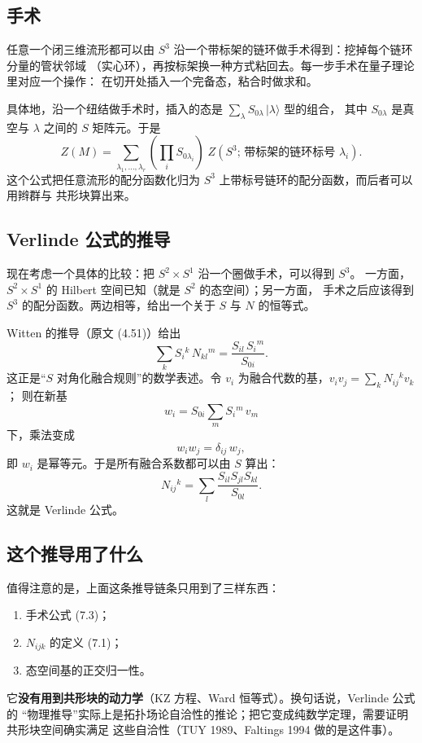 \subsection{手术}

任意一个闭三维流形都可以由 $S^3$ 沿一个带标架的链环做手术得到：挖掉每个链环分量的管状邻域
（实心环），再按标架换一种方式粘回去。每一步手术在量子理论里对应一个操作：
在切开处插入一个完备态，粘合时做求和。

具体地，沿一个纽结做手术时，插入的态是 $\sum_\lambda S_{0\lambda}\,|\lambda\rangle$ 型的组合，
其中 $S_{0\lambda}$ 是真空与 $\lambda$ 之间的 $S$ 矩阵元。于是
\begin{equation}
Z(M)=\sum_{\lambda_1,\dots,\lambda_r}
\left(\prod_{i}S_{0\lambda_i}\right)\;Z\!\left(S^3;\,\text{带标架的链环标号 }\lambda_i\right). \tag{7.3}
\end{equation}
这个公式把任意流形的配分函数化归为 $S^3$ 上带标号链环的配分函数，而后者可以用辫群与
共形块算出来。

\subsection{Verlinde 公式的推导}

现在考虑一个具体的比较：把 $S^2\times S^1$ 沿一个圈做手术，可以得到 $S^3$。
一方面，$S^2\times S^1$ 的 Hilbert 空间已知（就是 $S^2$ 的态空间）；另一方面，
手术之后应该得到 $S^3$ 的配分函数。两边相等，给出一个关于 $S$ 与 $N$ 的恒等式。

Witten 的推导（原文 (4.51)）给出
\begin{equation}
\sum_k S_i{}^k\,N_{kl}{}^m=\frac{S_{il}\,S_i{}^m}{S_{0i}}. \tag{7.4}
\end{equation}
这正是“$S$ 对角化融合规则”的数学表述。令 $v_i$ 为融合代数的基，$v_iv_j=\sum_k N_{ij}{}^kv_k$；
则在新基
\[
w_i=S_{0i}\sum_m S_i{}^m\,v_m
\]
下，乘法变成
\begin{equation}
w_iw_j=\delta_{ij}\,w_j, \tag{7.5}
\end{equation}
即 $w_i$ 是幂等元。于是所有融合系数都可以由 $S$ 算出：
\[
N_{ij}{}^k=\sum_l\frac{S_{il}S_{jl}S_{kl}}{S_{0l}}.
\]
这就是 Verlinde 公式。

\subsection{这个推导用了什么}

值得注意的是，上面这条推导链条只用到了三样东西：
\begin{enumerate}[leftmargin=*]
  \item 手术公式 (7.3)；
  \item $N_{ijk}$ 的定义 (7.1)；
  \item 态空间基的正交归一性。
\end{enumerate}
它\textbf{没有用到共形块的动力学}（KZ 方程、Ward 恒等式）。换句话说，Verlinde 公式的
“物理推导”实际上是拓扑场论自洽性的推论；把它变成纯数学定理，需要证明共形块空间确实满足
这些自洽性（TUY 1989、Faltings 1994 做的是这件事）。

